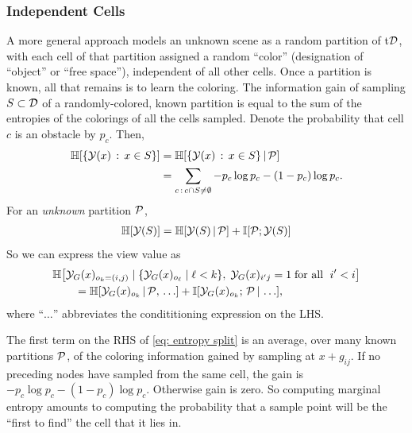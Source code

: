 \subsubsection{Independent Cells} \label{section: indcells}
A more general approach models an unknown scene as a 
random partition of t$\D$, with each cell of that partition assigned a random ``color''
(designation of ``object'' or ``free space''), independent of all other cells.
Once a partition is known, all that remains is to learn the coloring. 
The information gain of sampling $S\subs\D$ of a randomly-colored, known partition 
is equal to the sum of the entropies of the
colorings of all the cells sampled.
Denote the probability that cell $c$ is an obstacle by $p_c$.  Then,
\begin{align*}
\HH[\{\Y(x)\,:\,x\in S\}] &= \HH[\{\Y(x)\,:\,x\in S\}\,|\,\P]\\
&= \sum_{c\,:\,c\cap S\neq\emptyset} -p_c\log p_c - (1-p_c)\log p_c.
\end{align*}
For an \emph{unknown} partition $\P$, %
\begin{align}
\HH[\Y(S)] = \HH[\Y(S)\,|\,\P]  + \II[\P;\Y(S)]
\end{align}
So we can express the view value as
\begin{align}
&\HH\bigl[\Y_G(x)_{o_k=(i,j)}\;|\;
\{\Y_G(x)_{o_{\ell}}\;|\;\ell<k\},\;
\Y_G(x)_{i\1j}=1\;\text{for all $\;i\1<i$}
\bigr]\notag\\
&\qquad = \HH[\Y_G(x)_{o_k}\,|\,\P,\,\ldots] + \II[\Y_G(x)_{o_k};\,\P\,|\,\ldots], \label{eq: entropy split}
\end{align}
where ``$\ldots$'' abbreviates the condititioning expression on the LHS.

The first term on the RHS of \ref{eq: entropy split} is an average, over many known partitions  $\P$,
of the coloring information gained by sampling at $x+g_{ij}$.
If no preceding nodes have sampled from the same cell, the gain is
$-p_c\log p_c - (1-p_c)\log p_c$.  Otherwise gain is zero.
So computing marginal entropy amounts to computing the probability that a
sample point will be the ``first to find'' the cell that it lies in.

